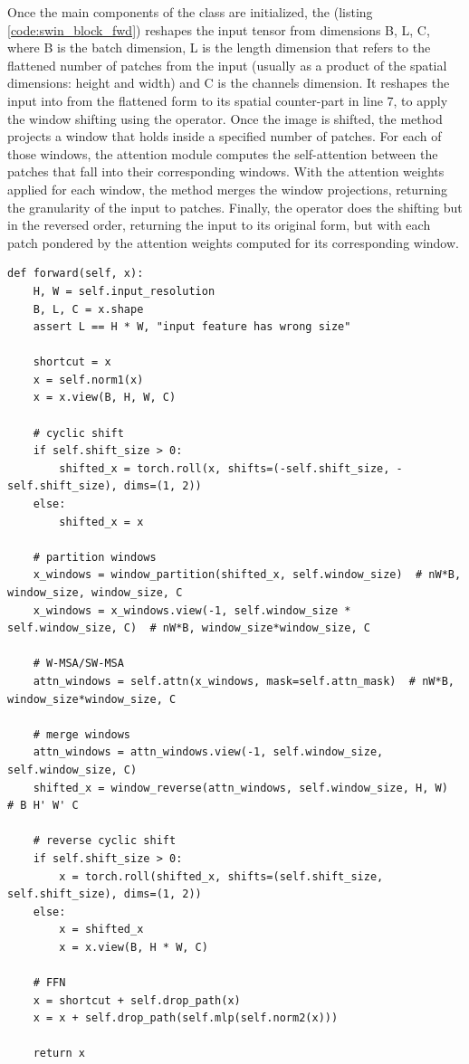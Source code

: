 Once the main components of the class are initialized, the  (listing \ref{code:swin_block_fwd}) reshapes the input tensor from dimensions B, L, C, where B is the batch dimension, L is the length dimension that refers to the flattened number of patches from the input (usually as a product of the spatial dimensions: height and width) and C is the channels dimension. It reshapes the input into from the flattened form to its spatial counter-part in line 7, to apply the window shifting using the  operator. Once the image is shifted, the  method projects a window that holds inside a specified number of patches. For each of those windows, the attention module computes the self-attention between the patches that fall into their corresponding windows. With the attention weights applied for each window, the  method merges the window projections, returning the granularity of the input to patches. Finally, the  operator does the shifting but in the reversed order, returning the input to its original form, but with each patch pondered by the attention weights computed for its corresponding window.

\begin{lstlisting}[caption={Forward method for the SWIN Block module}, label={code:swin_block_fwd}]
def forward(self, x):
	H, W = self.input_resolution
	B, L, C = x.shape
	assert L == H * W, "input feature has wrong size"
	
	shortcut = x
	x = self.norm1(x)
	x = x.view(B, H, W, C)
	
	# cyclic shift
	if self.shift_size > 0:
		shifted_x = torch.roll(x, shifts=(-self.shift_size, -self.shift_size), dims=(1, 2))
	else:
		shifted_x = x
		
	# partition windows
	x_windows = window_partition(shifted_x, self.window_size)  # nW*B, window_size, window_size, C
	x_windows = x_windows.view(-1, self.window_size * self.window_size, C)  # nW*B, window_size*window_size, C
	
	# W-MSA/SW-MSA
	attn_windows = self.attn(x_windows, mask=self.attn_mask)  # nW*B, window_size*window_size, C
	
	# merge windows
	attn_windows = attn_windows.view(-1, self.window_size, self.window_size, C)
	shifted_x = window_reverse(attn_windows, self.window_size, H, W)  # B H' W' C
	
	# reverse cyclic shift
	if self.shift_size > 0:
		x = torch.roll(shifted_x, shifts=(self.shift_size, self.shift_size), dims=(1, 2))
	else:
		x = shifted_x
		x = x.view(B, H * W, C)
	
	# FFN
	x = shortcut + self.drop_path(x)
	x = x + self.drop_path(self.mlp(self.norm2(x)))
	
	return x
\end{lstlisting}

